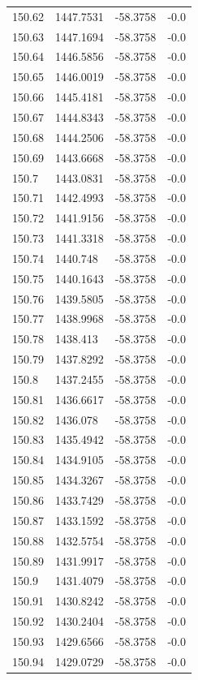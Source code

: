 \begin{table}[H]
\begin{tabular}{llll}
150.62 & 1447.7531 & -58.3758 & -0.0 \\
150.63 & 1447.1694 & -58.3758 & -0.0 \\
150.64 & 1446.5856 & -58.3758 & -0.0 \\
150.65 & 1446.0019 & -58.3758 & -0.0 \\
150.66 & 1445.4181 & -58.3758 & -0.0 \\
150.67 & 1444.8343 & -58.3758 & -0.0 \\
150.68 & 1444.2506 & -58.3758 & -0.0 \\
150.69 & 1443.6668 & -58.3758 & -0.0 \\
150.7 & 1443.0831 & -58.3758 & -0.0 \\
150.71 & 1442.4993 & -58.3758 & -0.0 \\
150.72 & 1441.9156 & -58.3758 & -0.0 \\
150.73 & 1441.3318 & -58.3758 & -0.0 \\
150.74 & 1440.748 & -58.3758 & -0.0 \\
150.75 & 1440.1643 & -58.3758 & -0.0 \\
150.76 & 1439.5805 & -58.3758 & -0.0 \\
150.77 & 1438.9968 & -58.3758 & -0.0 \\
150.78 & 1438.413 & -58.3758 & -0.0 \\
150.79 & 1437.8292 & -58.3758 & -0.0 \\
150.8 & 1437.2455 & -58.3758 & -0.0 \\
150.81 & 1436.6617 & -58.3758 & -0.0 \\
150.82 & 1436.078 & -58.3758 & -0.0 \\
150.83 & 1435.4942 & -58.3758 & -0.0 \\
150.84 & 1434.9105 & -58.3758 & -0.0 \\
150.85 & 1434.3267 & -58.3758 & -0.0 \\
150.86 & 1433.7429 & -58.3758 & -0.0 \\
150.87 & 1433.1592 & -58.3758 & -0.0 \\
150.88 & 1432.5754 & -58.3758 & -0.0 \\
150.89 & 1431.9917 & -58.3758 & -0.0 \\
150.9 & 1431.4079 & -58.3758 & -0.0 \\
150.91 & 1430.8242 & -58.3758 & -0.0 \\
150.92 & 1430.2404 & -58.3758 & -0.0 \\
150.93 & 1429.6566 & -58.3758 & -0.0 \\
150.94 & 1429.0729 & -58.3758 & -0.0 \\

\end{tabular}
\end{table}
